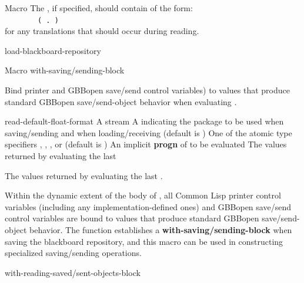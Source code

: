 \documentclass[10pt,twoside,english,pdftex]{article}
\begin{document}
\begin{functiondoc}{Macro}
The  , if specified,
should contain  of the form:\\
%
~~~~~~~~\texttt{( . )}\\
%
for any  translations that should occur during reading.

\begin{alsos}{load-blackboard-repository}
\end{alsos}

\end{functiondoc}


\begin{functiondoc}{Macro}%
  {with-saving/sending-block}%
  {\code{(} 
     \code{)}
    \superstar
    \returns{} \superstar}
  
\fnsyntax

\fnpurpose Bind printer and GBBopen save/send control variables) to
values that produce standard GBBopen save/send-object behavior when
evaluating .

\fnpackage {}

\fnmodule {}

\fnargs
\begin{args}{read-default-float-format}
\arg[stream] A stream
\arg[package] A  indicating the package to
be used when saving/sending and when loading/receiving (default is
)
 One of the atomic type specifiers
, , , or
 (default is )
\arg[forms] An implicit \textbf{progn} of  to be evaluated
\arg[results] The values returned by evaluating the last 
\end{args}

\fnreturns The values returned by evaluating the last .

\fndescription 
Within the dynamic extent of the body of , all Common Lisp
printer control variables (including any implementation-defined ones)
and GBBopen save/send control variables are bound to values that
produce standard GBBopen save/send-object behavior.  The function
\textbf{} establishes a
\textbf{with-saving/sending-block} when saving the blackboard
repository, and this macro can be used in constructing specialized
saving/sending operations.

\begin{alsos}{with-reading-saved/sent-objects-block}
\end{alsos}

\end{functiondoc}
\end{document}
